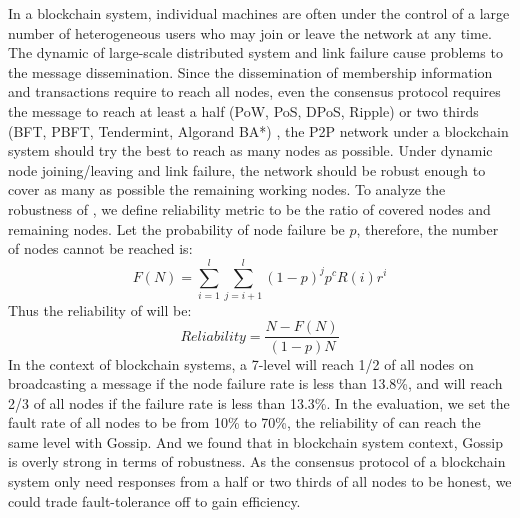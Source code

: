 In a blockchain system, individual machines are often under the control of a large number of heterogeneous users who may join or leave the network at any time. The dynamic of large-scale distributed system and link failure cause problems to the message dissemination. Since the dissemination of membership information and transactions require to reach all nodes, even the consensus protocol requires the message to reach at least a half (PoW, PoS, DPoS, Ripple) or two thirds (BFT, PBFT, Tendermint, Algorand BA*) \cite{zheng2016blockchain}, the P2P network under a blockchain system should try the best to reach as many nodes as possible. Under dynamic node joining/leaving and link failure, the network should be robust enough to cover as many as possible the remaining working nodes.
To analyze the robustness of \xxx, we define reliability metric to be the ratio of covered nodes and remaining nodes. Let the probability of node failure be $p$, therefore, the number of nodes cannot be reached is: $$F(N)=\sum_{i=1}^{l} \sum_{j=i+1}^{l}(1-p)^jp^cR(i)r^{i}$$
Thus the reliability of \xxx will be: $$Reliability = \frac{N-F(N)}{(1-p)N}$$
In the context of blockchain systems, a 7-level \xxx will reach 1/2 of all nodes on broadcasting a message if the node failure rate is less than 13.8\%, and will reach 2/3 of all nodes if the failure rate is less than 13.3\%. In the evaluation, we set the fault rate of all nodes to be from 10\% to 70\%, the reliability of \xxx can reach the same level with Gossip. And we found that in blockchain system context, Gossip is overly strong in terms of robustness. As the consensus protocol of a blockchain system only need responses from a half or two thirds of all nodes to be honest, we could trade fault-tolerance off to gain efficiency.